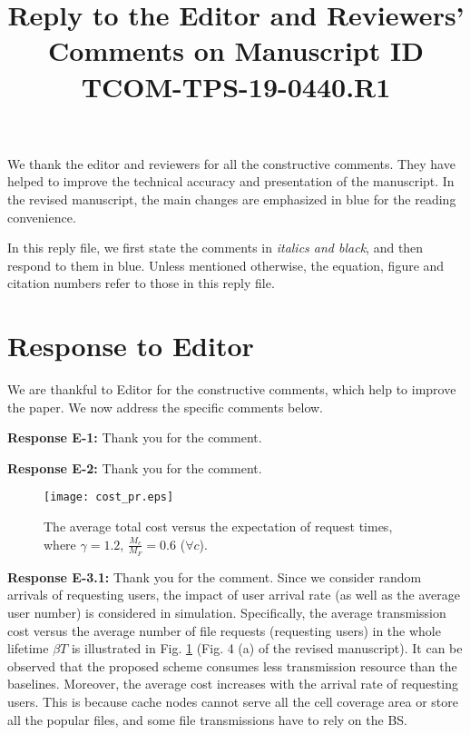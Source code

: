\documentclass[12pt,onecolumn]{IEEEtran}
\newcommand{\blue}{\color{blue}}
\newcommand{\black}{\color{black}}
\newcommand{\spaceblank}{\vskip 4mm}
\begin{document}
\title{Reply to the Editor and Reviewers' Comments on Manuscript ID TCOM-TPS-19-0440.R1}

\author{}
\maketitle

We thank the editor and reviewers for all the constructive comments. They have helped to improve the technical accuracy and presentation of the manuscript. In the revised manuscript, the main changes are emphasized in {\blue blue} for the reading convenience.

In this reply file, we first state the comments in {\em \black italics and black}, and then respond to them in {\color{blue}blue}. Unless mentioned otherwise, the equation, figure and citation numbers refer to those in this reply file.


\section{Response to Editor}
\spaceblank

{\blue
	We are thankful to Editor for the constructive comments, which help to improve the paper. We now address the specific comments below.
}

\spaceblank
{}
\spaceblank
	
{\blue \textbf{Response E-1:} 
	Thank you for the comment. 
}

\spaceblank
{}
\spaceblank
{\blue \textbf{Response E-2:} 
	Thank you for the comment. 
}
\spaceblank
{}
\spaceblank

\begin{figure}[tb]
	\centering
	\texttt{[image: cost\_pr.eps]} %
	\caption{The average total cost versus the expectation of request times, where $\gamma=1.2$,  $\frac{M_c}{M_F}=0.6$ ($\forall c$).}
	\label{fig:request}
\end{figure}

{\blue \textbf{Response E-3.1:} 
	Thank you for the comment. 	 Since we consider random arrivals of requesting users, the  impact of user arrival rate (as well as the average user number) is considered in simulation. 
	Specifically, the average transmission cost versus the average number of file requests (requesting users) in the whole lifetime $\beta T$ is illustrated in Fig. \ref{fig:request} (Fig. 4 (a) of the revised manuscript). It can be observed that the proposed scheme consumes less transmission resource than the baselines. Moreover, the average cost increases with the arrival rate of requesting users. This is because cache nodes cannot serve all the cell coverage area or store all the popular files, and some file transmissions have to rely on the BS.
}
\end{document}
